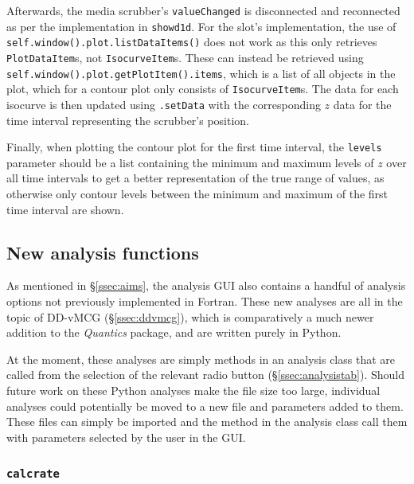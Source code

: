 \documentclass[12pt]{article}
\begin{document}
Afterwards, the media scrubber's \texttt{valueChanged} is disconnected and reconnected as per the implementation in \texttt{showd1d}. For the slot's implementation, the use of \texttt{self.window().plot.listDataItems()} does not work as this only retrieves \texttt{PlotDataItem}s, not \texttt{IsocurveItem}s. These can instead be retrieved using \texttt{self.window().plot.getPlotItem().items}, which is a list of all objects in the plot, which for a contour plot only consists of \texttt{IsocurveItem}s. The data for each isocurve is then updated using \texttt{.setData} with the corresponding \(z\) data for the time interval representing the scrubber's position.

Finally, when plotting the contour plot for the first time interval, the \texttt{levels} parameter should be a list containing the minimum and maximum levels of \(z\) over all time intervals to get a better representation of the true range of values, as otherwise only contour levels between the minimum and maximum of the first time interval are shown.

\subsection{New analysis functions}\label{ssec:new_analysis}

As mentioned in \S\ref{ssec:aims}, the analysis GUI also contains a handful of analysis options not previously implemented in Fortran. These new analyses are all in the topic of DD-vMCG (\S\ref{ssec:ddvmcg}), which is comparatively a much newer addition to the \textit{Quantics} package, and are written purely in Python.

At the moment, these analyses are simply methods in an analysis class that are called from the selection of the relevant radio button (\S\ref{ssec:analysistab}). Should future work on these Python analyses make the file size too large, individual analyses could potentially be moved to a new file and parameters added to them. These files can simply be imported and the method in the analysis class call them with parameters selected by the user in the GUI.

\subsubsection{\texttt{calcrate}}\label{sssec:calcrate}
\end{document}
